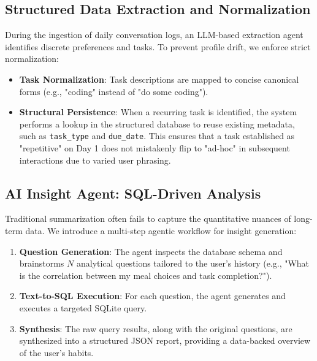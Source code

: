 \documentclass{article}
\begin{document}
\subsection{Structured Data Extraction and Normalization}
During the ingestion of daily conversation logs, an LLM-based extraction agent identifies discrete preferences and tasks. To prevent profile drift, we enforce strict normalization:
\begin{itemize}
    \item \textbf{Task Normalization}: Task descriptions are mapped to concise canonical forms (e.g., "coding" instead of "do some coding").
    \item \textbf{Structural Persistence}: When a recurring task is identified, the system performs a lookup in the structured database to reuse existing metadata, such as \texttt{task\_type} and \texttt{due\_date}. This ensures that a task established as "repetitive" on Day 1 does not mistakenly flip to "ad-hoc" in subsequent interactions due to varied user phrasing.
\end{itemize}

\subsection{AI Insight Agent: SQL-Driven Analysis}
Traditional summarization often fails to capture the quantitative nuances of long-term data. We introduce a multi-step agentic workflow for insight generation:
\begin{enumerate}
    \item \textbf{Question Generation}: The agent inspects the database schema and brainstorms $N$ analytical questions tailored to the user's history (e.g., "What is the correlation between my meal choices and task completion?").
    \item \textbf{Text-to-SQL Execution}: For each question, the agent generates and executes a targeted SQLite query.
    \item \textbf{Synthesis}: The raw query results, along with the original questions, are synthesized into a structured JSON report, providing a data-backed overview of the user's habits.
\end{enumerate}
\end{document}
